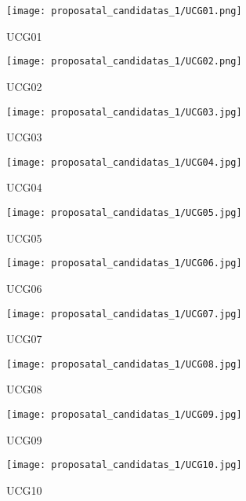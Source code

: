 \begin{figure}[!ht]
    \centering
    \captionsetup{justification=centering}
    \begin{subfigure}[b]{0.22\textwidth}
        \texttt{[image: proposatal\_candidatas\_1/UCG01.png]}
        \caption{UCG01}
    \end{subfigure}
    \begin{subfigure}[b]{0.22\textwidth}
        \texttt{[image: proposatal\_candidatas\_1/UCG02.png]}
        \caption{UCG02}
    \end{subfigure}
    \begin{subfigure}[b]{0.22\textwidth}
        \texttt{[image: proposatal\_candidatas\_1/UCG03.jpg]}
        \caption{UCG03}
    \end{subfigure}
    \begin{subfigure}[b]{0.22\textwidth}
        \texttt{[image: proposatal\_candidatas\_1/UCG04.jpg]}
        \caption{UCG04}
    \end{subfigure}
    \begin{subfigure}[b]{0.22\textwidth}
        \texttt{[image: proposatal\_candidatas\_1/UCG05.jpg]}
        \caption{UCG05}
    \end{subfigure}
    \begin{subfigure}[b]{0.22\textwidth}
        \texttt{[image: proposatal\_candidatas\_1/UCG06.jpg]}
        \caption{UCG06}
    \end{subfigure}
    \begin{subfigure}[b]{0.22\textwidth}
        \texttt{[image: proposatal\_candidatas\_1/UCG07.jpg]}
        \caption{UCG07}
    \end{subfigure}
    \begin{subfigure}[b]{0.22\textwidth}
        \texttt{[image: proposatal\_candidatas\_1/UCG08.jpg]}
        \caption{UCG08}
    \end{subfigure}
    \begin{subfigure}[b]{0.22\textwidth}
        \texttt{[image: proposatal\_candidatas\_1/UCG09.jpg]}
        \caption{UCG09}
    \end{subfigure}
    \begin{subfigure}[b]{0.22\textwidth}
        \texttt{[image: proposatal\_candidatas\_1/UCG10.jpg]}
        \caption{UCG10}
    \end{subfigure}
    \begin{subfigure}[b]{0.22\textwidth}

\end{subfigure}
\end{figure}

